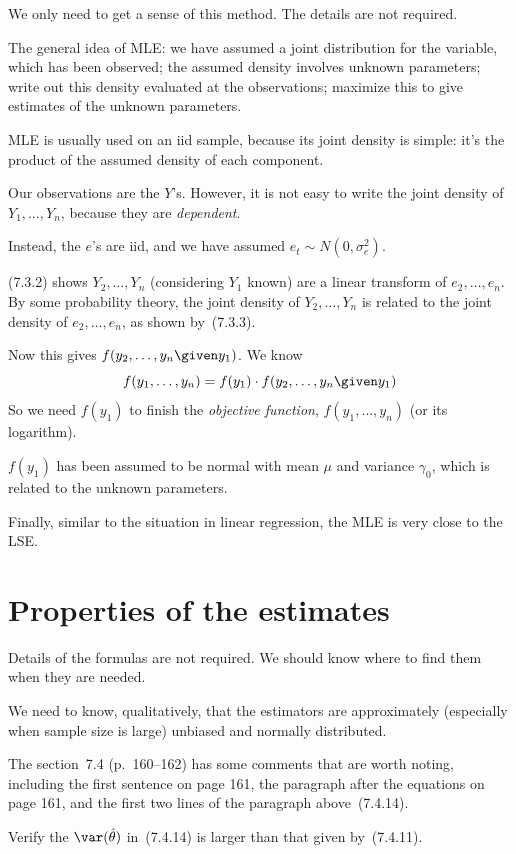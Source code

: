 \documentclass[12pt]{article}
\begin{document}
We only need to get a sense of this method.
The details are not required.

The general idea of MLE:
we have assumed a joint distribution for the variable, which has been
observed;
the assumed density involves unknown parameters;
write out this density evaluated at the observations;
maximize this to give estimates of the unknown parameters.

MLE is usually used on an iid sample,
because its joint density is simple: it's the product of the assumed
density of each component.

Our observations are the $Y$'s.
However, it is not easy to write the joint density of
$Y_1,\dotsc,Y_n$, because they are \emph{dependent}.

Instead, the $e$'s are iid,
and we have assumed $e_t \sim N(0, \sigma^2_e)$.

(7.3.2) shows $Y_2,\dotsc,Y_n$ (considering $Y_1$ known)
are a linear transform of $e_2,\dotsc,e_n$.
By some probability theory, the joint density
of $Y_2,\dotsc,Y_n$ is related to the joint density of
$e_2,\dotsc,e_n$, as shown by~(7.3.3).

Now this gives $f(y_2,\dotsc,y_n \given y_1)$.
We know
\[
f(y_1,\dotsc,y_n) = f(y_1) \cdot f(y_2,\dotsc,y_n\given y_1)
\]
So we need $f(y_1)$ to finish the \emph{objective function},
$f(y_1,\dotsc,y_n)$ (or its logarithm).

$f(y_1)$ has been assumed to be normal with mean $\mu$
and variance $\gamma_0$, which is related to
the unknown parameters.

Finally, similar to the situation in linear regression,
the MLE is very close to the LSE.

\section{Properties of the estimates}

Details of the formulas are not required.
We should know where to find them when they are needed.

We need to know, qualitatively, that the estimators
are approximately (especially when sample size is large)
unbiased and normally distributed.

The section~7.4 (p.~160--162) has some comments that are worth noting, including
the first sentence on page 161, the paragraph after the equations on
page 161, and the first two lines of the paragraph above~(7.4.14).

\exercise
Verify the $\var(\hat{\theta})$ in~(7.4.14) is larger than
that given by~(7.4.11).
\end{document}
